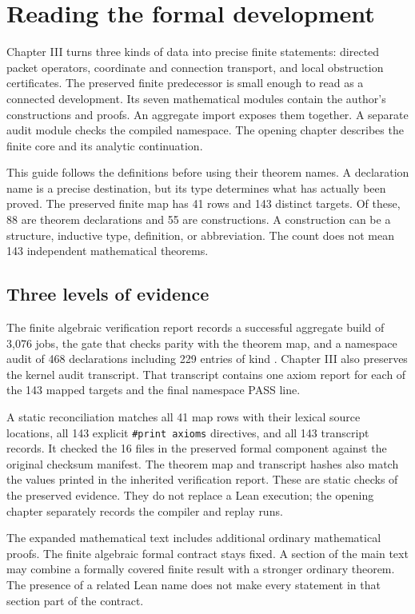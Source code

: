 \section{Reading the formal development}
Chapter III turns three kinds of data into precise finite statements: directed packet operators, coordinate and connection transport, and local obstruction certificates. The preserved finite predecessor is small enough to read as a connected development. Its seven mathematical modules contain the author's constructions and proofs. An aggregate import exposes them together. A separate audit module checks the compiled namespace. The opening chapter describes the finite core and its analytic continuation.

This guide follows the definitions before using their theorem names. A declaration name is a precise destination, but its type determines what has actually been proved. The preserved finite map has 41 rows and 143 distinct targets. Of these, 88 are theorem declarations and 55 are constructions. A construction can be a structure, inductive type, definition, or abbreviation. The count does not mean 143 independent mathematical theorems.

\subsection{Three levels of evidence}
The finite algebraic verification report records a successful aggregate build of 3,076 jobs, the gate that checks parity with the theorem map, and a namespace audit of 468 declarations including 229 entries of kind . Chapter III also preserves the kernel audit transcript. That transcript contains one axiom report for each of the 143 mapped targets and the final namespace PASS line.

A static reconciliation matches all 41 map rows with their lexical source locations, all 143 explicit \texttt{\#print axioms} directives, and all 143 transcript records. It checked the 16 files in the preserved formal component against the original checksum manifest. The theorem map and transcript hashes also match the values printed in the inherited verification report. These are static checks of the preserved evidence. They do not replace a Lean execution; the opening chapter separately records the compiler and replay runs.

The expanded mathematical text includes additional ordinary mathematical proofs. The finite algebraic formal contract stays fixed. A section of the main text may combine a formally covered finite result with a stronger ordinary theorem. The presence of a related Lean name does not make every statement in that section part of the contract.

